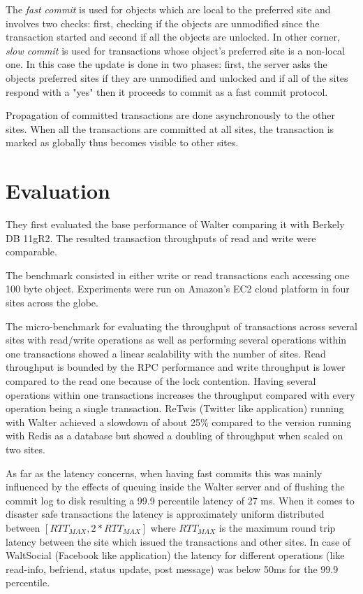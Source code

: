 \documentclass[a4paper]{article}
\begin{document}
The \textit{fast commit} is used for objects which are local to the preferred site and involves two checks: first, checking if the objects are unmodified since the transaction started and second if all the objects are unlocked. 
In other corner, \textit{slow commit} is used for transactions whose object's preferred site is a non-local one. In this case the update is done in two phases: first, the server asks the objects preferred sites if they are unmodified and unlocked and if all of the sites respond with a "yes" then it proceeds to commit as a fast commit protocol. %

Propagation of committed transactions are done asynchronously to the other sites. When all the transactions are committed at all sites, the transaction is marked as globally thus becomes visible to other sites. 

\section{Evaluation}

They first evaluated the base performance of Walter comparing it with Berkely DB 11gR2. The resulted transaction throughputs of read and write were comparable.

The benchmark consisted in either write or read transactions each accessing one 100 byte object. Experiments were run on Amazon's EC2 cloud platform in four sites across the globe. 

The micro-benchmark for evaluating the throughput of transactions across several sites with read/write operations as well as performing several operations within one transactions showed a linear scalability with the number of sites. Read throughput is bounded by the RPC performance and write throughput is lower compared to the read one because of the lock contention. Having several operations within one transactions increases the throughput compared with every operation being a single transaction. ReTwis (Twitter like application) running with Walter achieved a slowdown of about 25\% compared to the version running with Redis as a database but showed a doubling of throughput when scaled on two sites. 

As far as the latency concerns, when having fast commits this was mainly influenced by the effects of queuing inside the Walter server and of flushing the commit log to disk resulting a 99.9 percentile latency of 27 ms. When it comes to disaster safe transactions the latency is approximately uniform distributed between $[RTT_{MAX},2*RTT_{MAX}]$ where $RTT_{MAX}$ is the maximum round trip latency between the site which issued the transactions and other sites.
In case of WaltSocial (Facebook like application) the latency for different operations (like read-info, befriend, status update, post message) was below 50ms for the 99.9 percentile.
\end{document}
